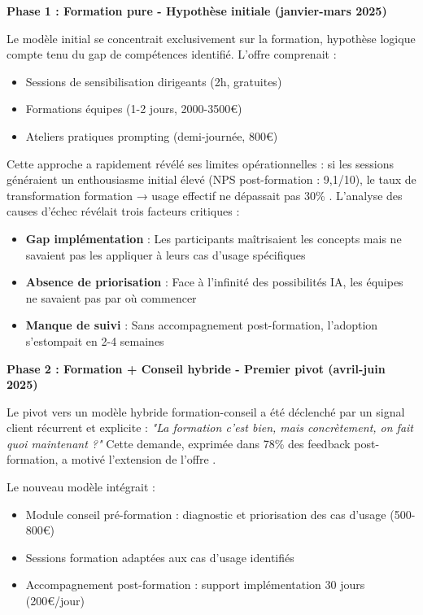 \textbf{Phase 1 : Formation pure - Hypothèse initiale (janvier-mars 2025)}

Le modèle initial se concentrait exclusivement sur la formation, hypothèse logique compte tenu du gap de compétences identifié. L'offre comprenait :
\begin{itemize}
    \item Sessions de sensibilisation dirigeants (2h, gratuites)
    \item Formations équipes (1-2 jours, 2000-3500€)
    \item Ateliers pratiques prompting (demi-journée, 800€)
\end{itemize}

Cette approche a rapidement révélé ses limites opérationnelles : si les sessions généraient un enthousiasme initial élevé (NPS post-formation : 9,1/10), le taux de transformation formation → usage effectif ne dépassait pas 30\% \cite{luwai2025metrics}. L'analyse des causes d'échec révélait trois facteurs critiques :
\begin{itemize}
    \item \textbf{Gap implémentation} : Les participants maîtrisaient les concepts mais ne savaient pas les appliquer à leurs cas d'usage spécifiques
    \item \textbf{Absence de priorisation} : Face à l'infinité des possibilités IA, les équipes ne savaient pas par où commencer
    \item \textbf{Manque de suivi} : Sans accompagnement post-formation, l'adoption s'estompait en 2-4 semaines
\end{itemize}

\textbf{Phase 2 : Formation + Conseil hybride - Premier pivot (avril-juin 2025)}

Le pivot vers un modèle hybride formation-conseil a été déclenché par un signal client récurrent et explicite : \emph{"La formation c'est bien, mais concrètement, on fait quoi maintenant ?"} Cette demande, exprimée dans 78\% des feedback post-formation, a motivé l'extension de l'offre \cite{luwai2025feedback}.

Le nouveau modèle intégrait :
\begin{itemize}
    \item Module conseil pré-formation : diagnostic et priorisation des cas d'usage (500-800€)
    \item Sessions formation adaptées aux cas d'usage identifiés
    \item Accompagnement post-formation : support implémentation 30 jours (200€/jour)
\end{itemize}


